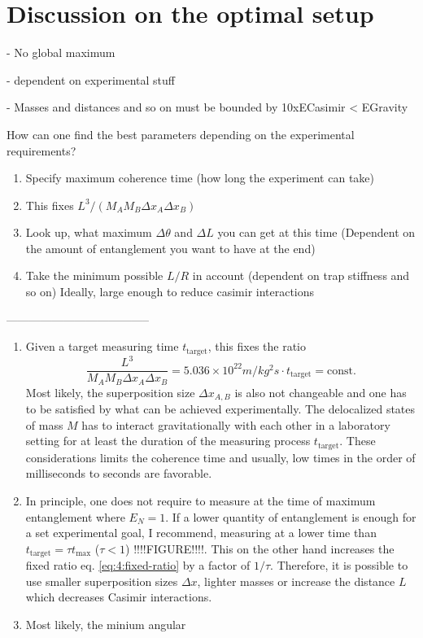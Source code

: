 \section{Discussion on the optimal setup}\label{sec:4:discussion}

- No global maximum

- dependent on experimental stuff

- Masses and distances and so on must be bounded by 10xECasimir < EGravity

How can one find the best parameters depending on the experimental requirements?
\begin{enumerate}
  \item Specify maximum coherence time (how long the experiment can take)
  \item This fixes $L^3/(M_A M_B \Delta x_A \Delta x_B)$
  \item Look up, what maximum $\Delta \theta$ and $\Delta L$ you can get at this time (Dependent on the amount of entanglement you want to have at the end)
  \item Take the minimum possible $L/R$ in account (dependent on trap stiffness and so on) Ideally, large enough to reduce casimir interactions
\end{enumerate}


-------------------------------------- 

\begin{enumerate}
  \item Given a target measuring time $t_\mathrm{target}$, this fixes the ratio
  \begin{equation}\label{eq:4:fixed-ratio}
    \frac{L^3}{M_A M_B \Delta x_A \Delta x_B} = 5.036\times 10^{22}\si{m/kg^2s} \cdot t_\mathrm{target} = \mathrm{const.}
  \end{equation}
  Most likely, the superposition size $\Delta x_{A,B}$ is also not changeable and one has to be satisfied by what can be achieved experimentally. The delocalized states of mass $M$ has to interact gravitationally with each other in a laboratory setting for at least the duration of the measuring process $t_\mathrm{target}$. These considerations limits the coherence time and usually, low times in the order of milliseconds to seconds are favorable.
  \item In principle, one does not require to measure at the time of maximum entanglement where $E_N = 1$. If a lower quantity of entanglement is enough for a set experimental goal, I recommend, measuring at a lower time than $t_\mathrm{target} = \tau t_\mathrm{max}$ ($\tau < 1$) !!!!FIGURE!!!!. This on the other hand increases the fixed ratio eq. \eqref{eq:4:fixed-ratio} by a factor of $1/\tau$.
  Therefore, it is possible to use smaller superposition sizes $\Delta x$, lighter masses or increase the distance $L$ which decreases Casimir interactions.
  \item Most likely, the minium angular 
\end{enumerate}